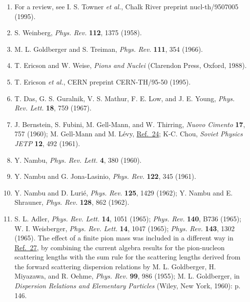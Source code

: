 \begin{enumerate}
\item {}\label{ch19-ref-9}
For a review, see I. S. Towner \emph{et al.}, Chalk River preprint nucl-th/9507005 (1995).

\item {}\label{ch19-ref-10}
S. Weinberg, \emph{Phys. Rev.} \textbf{112}, 1375 (1958).

\item {}\label{ch19-ref-11}
M. L. Goldberger and S. Treiman, \emph{Phys. Rev.} \textbf{111}, 354 (1966).

\item {}\label{ch19-ref-12}
T. Ericson and W. Weise, \emph{Pions and Nuclei} (Clarendon Press, Oxford, 1988).

\item {}\label{ch19-ref-13}
T. Ericson \emph{et al.}, CERN preprint CERN-TH/95-50 (1995).

\item {}\label{ch19-ref-14}
T. Das, G. S. Guralnik, V. S. Mathur, F. E. Low, and J. E. Young, \emph{Phys. Rev. Lett.} \textbf{18}, 759 (1967).

\item {}\label{ch19-ref-15}
J. Bernstein, S. Fubini, M. Gell-Mann, and W. Thirring, \emph{Nuovo Cimento} \textbf{17}, 757 (1960); M. Gell-Mann and M. L\'evy, \hyperref[ch19-ref-24]{Ref.~24}; K-C. Chou, \emph{Soviet Physics JETP} \textbf{12}, 492 (1961).

\item {}\label{ch19-ref-16}
Y. Nambu, \emph{Phys. Rev. Lett.} \textbf{4}, 380 (1960).

\item {}\label{ch19-ref-17}
Y. Nambu and G. Jona-Lasinio, \emph{Phys. Rev.} \textbf{122}, 345 (1961).

\item {}\label{ch19-ref-18}
Y. Nambu and D. Luri\'e, \emph{Phys. Rev.} \textbf{125}, 1429 (1962); Y. Nambu and E. Shrauner, \emph{Phys. Rev.} \textbf{128}, 862 (1962).

\item {}\label{ch19-ref-19}
S. L. Adler, \emph{Phys. Rev. Lett.} \textbf{14}, 1051 (1965); \emph{Phys. Rev.} \textbf{140}, B736 (1965); W. I. Weisberger, \emph{Phys. Rev. Lett.} \textbf{14}, 1047 (1965); \emph{Phys. Rev.} \textbf{143}, 1302 (1965). The effect of a finite pion mass was included in a different way in \hyperref[ch19-ref-27]{Ref.~27}, by combining the current algebra results for the pion-nucleon scattering lengths with the sum rule for the scattering lengths derived from the forward scattering dispersion relations by M. L. Goldberger, H. Miyazawa, and R. Oehme, \emph{Phys. Rev.} \textbf{99}, 986 (1955); M. L. Goldberger, in \emph{Dispersion Relations and Elementary Particles} (Wiley, New York, 1960): p. 146.


\end{enumerate}

